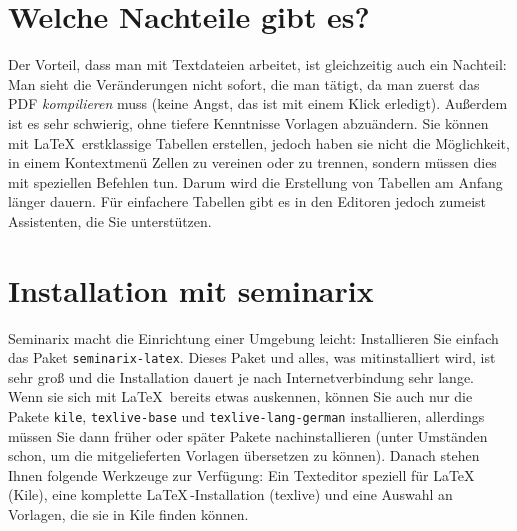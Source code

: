\documentclass[a4paper,10pt]{scrartcl}
\begin{document}
\section*{Welche Nachteile gibt es?}
Der Vorteil, dass man mit Textdateien arbeitet, ist gleichzeitig auch ein Nachteil: Man sieht die Veränderungen nicht sofort, die man tätigt, da man zuerst das PDF \emph{kompilieren} muss (keine Angst, das ist mit einem Klick erledigt). Außerdem ist es sehr schwierig, ohne tiefere Kenntnisse Vorlagen abzuändern. Sie können mit \LaTeX \, erstklassige Tabellen erstellen, jedoch haben sie nicht die Möglichkeit, in einem Kontextmenü Zellen zu vereinen oder zu trennen, sondern müssen dies mit speziellen Befehlen tun. Darum wird die Erstellung von Tabellen am Anfang länger dauern. Für einfachere Tabellen gibt es in den Editoren jedoch zumeist Assistenten, die Sie unterstützen.

\section*{Installation mit seminarix}
Seminarix macht die Einrichtung einer Umgebung leicht: Installieren Sie einfach das Paket \texttt{seminarix-latex}. Dieses Paket und alles, was mitinstalliert wird, ist sehr groß und die Installation dauert je nach Internetverbindung sehr lange. Wenn sie sich mit \LaTeX \, bereits etwas auskennen, können Sie auch nur die Pakete \texttt{kile}, \texttt{texlive-base} und \texttt{texlive-lang-german} installieren, allerdings müssen Sie dann früher oder später Pakete nachinstallieren (unter Umständen schon, um die mitgelieferten Vorlagen übersetzen zu können). Danach stehen Ihnen folgende Werkzeuge zur Verfügung: Ein Texteditor speziell für \LaTeX \, (Kile), eine komplette \LaTeX \,-Installation (texlive) und eine Auswahl an Vorlagen, die sie in Kile finden können.
\end{document}
